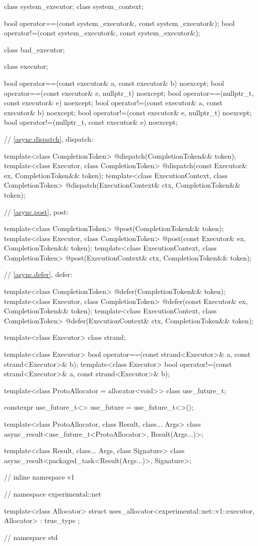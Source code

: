 \begin{codeblock}
{{{  class system_executor;
  class system_context;

  bool operator==(const system_executor&, const system_executor&);
  bool operator!=(const system_executor&, const system_executor&);

  class bad_executor;

  class executor;

  bool operator==(const executor& a, const executor& b) noexcept;
  bool operator==(const executor& e, nullptr_t) noexcept;
  bool operator==(nullptr_t, const executor& e) noexcept;
  bool operator!=(const executor& a, const executor& b) noexcept;
  bool operator!=(const executor& e, nullptr_t) noexcept;
  bool operator!=(nullptr_t, const executor& e) noexcept;

  // \ref{async.dispatch}, dispatch:

  template<class CompletionToken>
    @\DEDUCED@ dispatch(CompletionToken&& token);
  template<class Executor, class CompletionToken>
    @\DEDUCED@ dispatch(const Executor& ex, CompletionToken&& token);
  template<class ExecutionContext, class CompletionToken>
    @\DEDUCED@ dispatch(ExecutionContext& ctx, CompletionToken&& token);

  // \ref{async.post}, post:

  template<class CompletionToken>
    @\DEDUCED@ post(CompletionToken&& token);
  template<class Executor, class CompletionToken>
    @\DEDUCED@ post(const Executor& ex, CompletionToken&& token);
  template<class ExecutionContext, class CompletionToken>
    @\DEDUCED@ post(ExecutionContext& ctx, CompletionToken&& token);

  // \ref{async.defer}, defer:

  template<class CompletionToken>
    @\DEDUCED@ defer(CompletionToken&& token);
  template<class Executor, class CompletionToken>
    @\DEDUCED@ defer(const Executor& ex, CompletionToken&& token);
  template<class ExecutionContext, class CompletionToken>
    @\DEDUCED@ defer(ExecutionContext& ctx, CompletionToken&& token);

  template<class Executor>
    class strand;

  template<class Executor>
    bool operator==(const strand<Executor>& a, const strand<Executor>& b);
  template<class Executor>
    bool operator!=(const strand<Executor>& a, const strand<Executor>& b);

  template<class ProtoAllocator = allocator<void>>
    class use_future_t;

  constexpr use_future_t<> use_future = use_future_t<>();

  template<class ProtoAllocator, class Result, class... Args>
    class async_result<use_future_t<ProtoAllocator>, Result(Args...)>;

  template<class Result, class... Args, class Signature>
    class async_result<packaged_task<Result(Args...)>, Signature>;

} // inline namespace v1
} // namespace experimental::net

  template<class Allocator>
    struct uses_allocator<experimental::net::v1::executor, Allocator>
      : true_type {};

} // namespace std
\end{codeblock}
